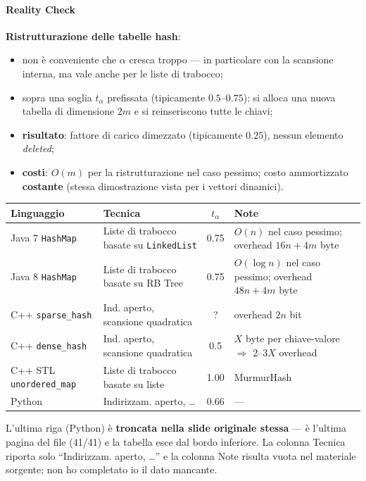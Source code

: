 \documentclass[12pt, a4paper]{article}
\begin{document}
\paragraph{Reality Check}

\textbf{Ristrutturazione delle tabelle hash}:
\begin{itemize}
    \item non è conveniente che $\alpha$ cresca troppo — in particolare con la scansione interna, ma vale anche per le liste di trabocco;
    \item sopra una soglia $t_\alpha$ prefissata (tipicamente $0.5$--$0.75$): si alloca una nuova tabella di dimensione $2m$ e si reinseriscono tutte le chiavi;
    \item \textbf{risultato}: fattore di carico dimezzato (tipicamente $0.25$), nessun elemento \textit{deleted};
    \item \textbf{costi}: $O(m)$ per la ristrutturazione nel caso pessimo; costo ammortizzato \textbf{costante} (stessa dimostrazione vista per i vettori dinamici).
\end{itemize}

\begin{center}
\small
\begin{tabular}{p{2.2cm}p{3.4cm}cp{4.5cm}}
\toprule
\textbf{Linguaggio} & \textbf{Tecnica} & $t_\alpha$ & \textbf{Note} \\
\midrule
Java 7 \texttt{HashMap} & Liste di trabocco basate su \texttt{LinkedList} & 0.75 & $O(n)$ nel caso pessimo; overhead $16n+4m$ byte \\
Java 8 \texttt{HashMap} & Liste di trabocco basate su RB Tree & 0.75 & $O(\log n)$ nel caso pessimo; overhead $48n+4m$ byte \\
C++ \texttt{sparse\_hash} & Ind. aperto, scansione quadratica & ? & overhead $2n$ bit \\
C++ \texttt{dense\_hash} & Ind. aperto, scansione quadratica & 0.5 & $X$ byte per chiave-valore $\Rightarrow$ 2--3$X$ overhead \\
C++ STL \texttt{unordered\_map} & Liste di trabocco basate su liste & 1.00 & MurmurHash \\
Python & Indirizzam. aperto, \dots & 0.66 & --- \\
\bottomrule
\end{tabular}
\end{center}

\begin{tcolorbox}[colback=lightergray!5, colframe=tocsubsec, title=\textbf{Nota}]
L'ultima riga (Python) è \textbf{troncata nella slide originale stessa} — è l'ultima pagina del file (41/41) e la tabella esce dal bordo inferiore. La colonna Tecnica riporta solo ``Indirizzam. aperto, \dots'' e la colonna Note risulta vuota nel materiale sorgente; non ho completato io il dato mancante.
\end{tcolorbox}
\end{document}

